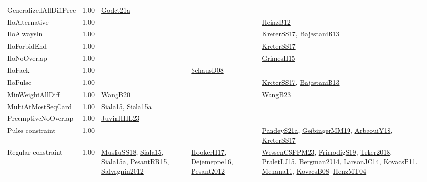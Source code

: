 {\begin{longtable}{p{3cm}r>{\raggedright\arraybackslash}p{6cm}>{\raggedright\arraybackslash}p{6cm}>{\raggedright\arraybackslash}p{8cm}}
\index{GeneralizedAllDiffPrec}\index{Constraints!GeneralizedAllDiffPrec}GeneralizedAllDiffPrec &  1.00 & \hyperref[detail:Godet21a]{Godet21a} &  & \\
\index{IloAlternative}\index{Constraints!IloAlternative}IloAlternative &  1.00 &  &  & \hyperref[detail:HeinzB12]{HeinzB12}\\
\index{IloAlwaysIn}\index{Constraints!IloAlwaysIn}IloAlwaysIn &  1.00 &  &  & \hyperref[detail:KreterSS17]{KreterSS17}, \hyperref[detail:BajestaniB13]{BajestaniB13}\\
\index{IloForbidEnd}\index{Constraints!IloForbidEnd}IloForbidEnd &  1.00 &  &  & \hyperref[detail:KreterSS17]{KreterSS17}\\
\index{IloNoOverlap}\index{Constraints!IloNoOverlap}IloNoOverlap &  1.00 &  &  & \hyperref[detail:GrimesH15]{GrimesH15}\\
\index{IloPack}\index{Constraints!IloPack}IloPack &  1.00 &  & \hyperref[detail:SchausD08]{SchausD08} & \\
\index{IloPulse}\index{Constraints!IloPulse}IloPulse &  1.00 &  &  & \hyperref[detail:KreterSS17]{KreterSS17}, \hyperref[detail:BajestaniB13]{BajestaniB13}\\
\index{MinWeightAllDiff}\index{Constraints!MinWeightAllDiff}MinWeightAllDiff &  1.00 & \hyperref[detail:WangB20]{WangB20} &  & \hyperref[detail:WangB23]{WangB23}\\
\index{MultiAtMostSeqCard}\index{Constraints!MultiAtMostSeqCard}MultiAtMostSeqCard &  1.00 & \hyperref[detail:Siala15]{Siala15}, \hyperref[detail:Siala15a]{Siala15a} &  & \\
\index{PreemptiveNoOverlap}\index{Constraints!PreemptiveNoOverlap}PreemptiveNoOverlap &  1.00 & \hyperref[detail:JuvinHHL23]{JuvinHHL23} &  & \\
\index{Pulse constraint}\index{Constraints!Pulse constraint}Pulse constraint &  1.00 &  &  & \hyperref[detail:PandeyS21a]{PandeyS21a}, \hyperref[detail:GeibingerMM19]{GeibingerMM19}, \hyperref[detail:ArbaouiY18]{ArbaouiY18}, \hyperref[detail:KreterSS17]{KreterSS17}\\
\index{Regular constraint}\index{Constraints!Regular constraint}Regular constraint &  1.00 & \hyperref[detail:MusliuSS18]{MusliuSS18}, \hyperref[detail:Siala15]{Siala15}, \hyperref[detail:Siala15a]{Siala15a}, \hyperref[detail:PesantRR15]{PesantRR15}, \hyperref[detail:Salvagnin2012]{Salvagnin2012} & \hyperref[detail:HookerH17]{HookerH17}, \hyperref[detail:Dejemeppe16]{Dejemeppe16}, \hyperref[detail:Pesant2012]{Pesant2012} & \hyperref[detail:WessenCSFPM23]{WessenCSFPM23}, \hyperref[detail:FrimodigS19]{FrimodigS19}, \hyperref[detail:Trker2018]{Trker2018}, \hyperref[detail:PraletLJ15]{PraletLJ15}, \hyperref[detail:Bergman2014]{Bergman2014}, \hyperref[detail:LarsonJC14]{LarsonJC14}, \hyperref[detail:KovacsB11]{KovacsB11}, \hyperref[detail:Menana11]{Menana11}, \hyperref[detail:KovacsB08]{KovacsB08}, \hyperref[detail:HenzMT04]{HenzMT04}\\

\end{longtable}}

